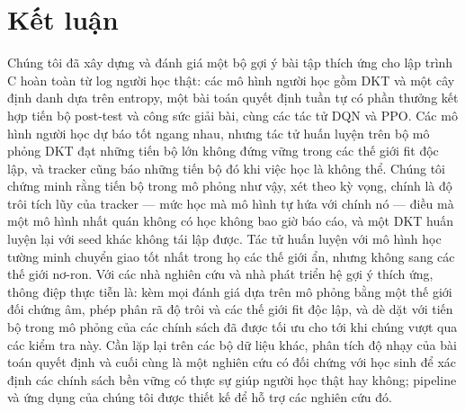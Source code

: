 \section{Kết luận}\label{sec:conclusion}

Chúng tôi đã xây dựng và đánh giá một bộ gợi ý bài tập thích ứng cho lập trình C hoàn toàn từ log người học thật: các mô hình người học gồm DKT và một cây định danh dựa trên entropy, một bài toán quyết định tuần tự có phần thưởng kết hợp tiến bộ post-test và công sức giải bài, cùng các tác tử DQN và PPO. Các mô hình người học dự báo tốt ngang nhau, nhưng tác tử huấn luyện trên bộ mô phỏng DKT đạt những tiến bộ lớn không đứng vững trong các thế giới fit độc lập, và tracker cũng báo những tiến bộ đó khi việc học là không thể. Chúng tôi chứng minh rằng tiến bộ trong mô phỏng như vậy, xét theo kỳ vọng, chính là độ trôi tích lũy của tracker — mức học mà mô hình tự hứa với chính nó — điều mà một mô hình nhất quán không có học không bao giờ báo cáo, và một DKT huấn luyện lại với seed khác không tái lập được. Tác tử huấn luyện với mô hình học tường minh chuyển giao tốt nhất trong họ các thế giới ẩn, nhưng không sang các thế giới nơ-ron. Với các nhà nghiên cứu và nhà phát triển hệ gợi ý thích ứng, thông điệp thực tiễn là: kèm mọi đánh giá dựa trên mô phỏng bằng một thế giới đối chứng âm, phép phân rã độ trôi và các thế giới fit độc lập, và dè dặt với tiến bộ trong mô phỏng của các chính sách đã được tối ưu cho tới khi chúng vượt qua các kiểm tra này. Cần lặp lại trên các bộ dữ liệu khác, phân tích độ nhạy của bài toán quyết định và cuối cùng là một nghiên cứu có đối chứng với học sinh để xác định các chính sách bền vững có thực sự giúp người học thật hay không; pipeline và ứng dụng của chúng tôi được thiết kế để hỗ trợ các nghiên cứu đó.
